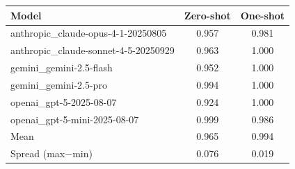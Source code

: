 \begin{tabular}{l|c|c}
\hline
Model & Zero-shot & One-shot\\
\hline
anthropic_claude-opus-4-1-20250805 & 0.957 & 0.981\\
anthropic_claude-sonnet-4-5-20250929 & 0.963 & 1.000\\
gemini_gemini-2.5-flash & 0.952 & 1.000\\
gemini_gemini-2.5-pro & 0.994 & 1.000\\
openai_gpt-5-2025-08-07 & 0.924 & 1.000\\
openai_gpt-5-mini-2025-08-07 & 0.999 & 0.986\\
\hline
Mean & 0.965 & 0.994\\
Spread (max$-$min) & 0.076 & 0.019\\
\hline
\end{tabular}
